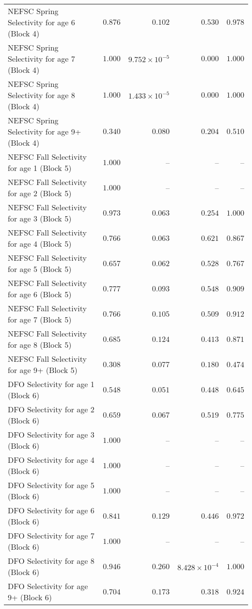 \documentclass[
]{article}
\begin{document}
\begin{landscape}
\begin{longtable}[t]{lrrrr}
NEFSC Spring Selectivity for age 6 (Block 4) & $0.876$ & $0.102$ & $0.530$ & $0.978$\\
NEFSC Spring Selectivity for age 7 (Block 4) & $1.000$ & $9.752\times 10^{-5}$ & $0.000$ & $1.000$\\
NEFSC Spring Selectivity for age 8 (Block 4) & $1.000$ & $1.433\times 10^{-5}$ & $0.000$ & $1.000$\\
NEFSC Spring Selectivity for age 9+ (Block 4) & $0.340$ & $0.080$ & $0.204$ & $0.510$\\
\addlinespace
NEFSC Fall Selectivity for age 1 (Block 5) & $1.000$ & -- & -- & --\\
NEFSC Fall Selectivity for age 2 (Block 5) & $1.000$ & -- & -- & --\\
NEFSC Fall Selectivity for age 3 (Block 5) & $0.973$ & $0.063$ & $0.254$ & $1.000$\\
NEFSC Fall Selectivity for age 4 (Block 5) & $0.766$ & $0.063$ & $0.621$ & $0.867$\\
NEFSC Fall Selectivity for age 5 (Block 5) & $0.657$ & $0.062$ & $0.528$ & $0.767$\\
\addlinespace
NEFSC Fall Selectivity for age 6 (Block 5) & $0.777$ & $0.093$ & $0.548$ & $0.909$\\
NEFSC Fall Selectivity for age 7 (Block 5) & $0.766$ & $0.105$ & $0.509$ & $0.912$\\
NEFSC Fall Selectivity for age 8 (Block 5) & $0.685$ & $0.124$ & $0.413$ & $0.871$\\
NEFSC Fall Selectivity for age 9+ (Block 5) & $0.308$ & $0.077$ & $0.180$ & $0.474$\\
DFO Selectivity for age 1 (Block 6) & $0.548$ & $0.051$ & $0.448$ & $0.645$\\
\addlinespace
DFO Selectivity for age 2 (Block 6) & $0.659$ & $0.067$ & $0.519$ & $0.775$\\
DFO Selectivity for age 3 (Block 6) & $1.000$ & -- & -- & --\\
DFO Selectivity for age 4 (Block 6) & $1.000$ & -- & -- & --\\
DFO Selectivity for age 5 (Block 6) & $1.000$ & -- & -- & --\\
DFO Selectivity for age 6 (Block 6) & $0.841$ & $0.129$ & $0.446$ & $0.972$\\
\addlinespace
DFO Selectivity for age 7 (Block 6) & $1.000$ & -- & -- & --\\
DFO Selectivity for age 8 (Block 6) & $0.946$ & $0.260$ & $8.428\times 10^{-4}$ & $1.000$\\
DFO Selectivity for age 9+ (Block 6) & $0.704$ & $0.173$ & $0.318$ & $0.924$\\

\end{longtable}
\end{landscape}
\end{document}
